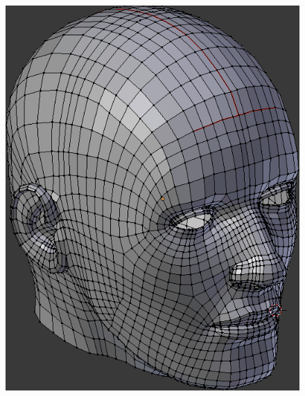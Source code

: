 \documentclass{article}
\begin{document}
\begin{figure}[H]
    \centering
    \begin{minipage}{.5\textwidth}
        \centering
        \includegraphics[width=\linewidth]{model.png}
    \end{minipage}%
    \begin{minipage}{.5\textwidth}
        \centering

\end{minipage}
\end{figure}
\end{document}
